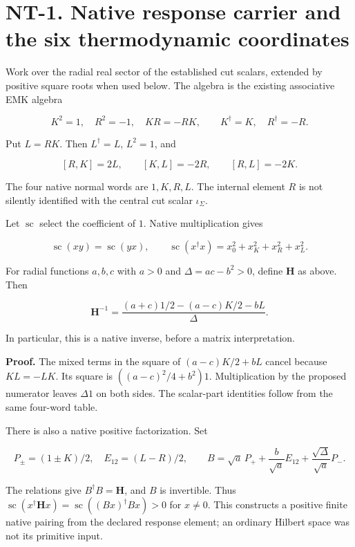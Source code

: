 \documentclass[
  11pt,
]{article}
\begin{document}
\hypertarget{nt-1.-native-response-carrier-and-the-six-thermodynamic-coordinates}{%
\section{NT-1. Native response carrier and the six thermodynamic
coordinates}\label{nt-1.-native-response-carrier-and-the-six-thermodynamic-coordinates}}

Work over the radial real sector of the established cut scalars,
extended by positive square roots when used below. The algebra is the
existing associative EMK algebra

\[
K^2=1,\quad R^2=-1,\quad KR=-RK,\qquad
K^\dagger=K,\quad R^\dagger=-R.
\]

Put \(L=RK\). Then \(L^\dagger=L\), \(L^2=1\), and

\[
[R,K]=2L,\qquad [K,L]=-2R,\qquad [R,L]=-2K.
\]

The four native normal words are \(1,K,R,L\). The internal element \(R\)
is not silently identified with the central cut scalar \(\iota_\Sigma\).

Let \(\operatorname{sc}\) select the coefficient of \(1\). Native
multiplication gives

\[
\operatorname{sc}(xy)=\operatorname{sc}(yx),\qquad
\operatorname{sc}(x^\dagger x)=x_0^2+x_K^2+x_R^2+x_L^2.
\]

For radial functions \(a,b,c\) with \(a>0\) and \(\Delta=ac-b^2>0\),
define \(\mathbf H\) as above. Then

\[
\mathbf H^{-1}=
\frac{(a+c)1/2-(a-c)K/2-bL}{\Delta}.
\]

In particular, this is a native inverse, before a matrix interpretation.

\textbf{Proof.} The mixed terms in the square of \((a-c)K/2+bL\) cancel
because \(KL=-LK\). Its square is \(((a-c)^2/4+b^2)1\). Multiplication
by the proposed numerator leaves \(\Delta1\) on both sides. The
scalar-part identities follow from the same four-word table.

There is also a native positive factorization. Set

\[
P_\pm=(1\pm K)/2,\quad E_{12}=(L-R)/2,\qquad
B=\sqrt a\,P_++\frac b{\sqrt a}E_{12}
                  +\frac{\sqrt\Delta}{\sqrt a}P_-.
\]

The relations give \(B^\dagger B=\mathbf H\), and \(B\) is invertible.
Thus
\(\operatorname{sc}(x^\dagger\mathbf Hx) =\operatorname{sc}((Bx)^\dagger Bx)>0\)
for \(x\ne0\). This constructs a positive finite native pairing from the
declared response element; an ordinary Hilbert space was not its
primitive input.
\end{document}
